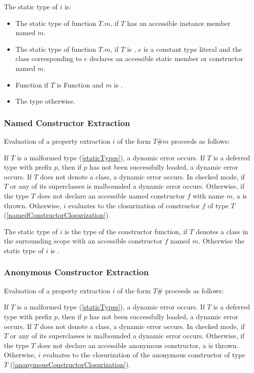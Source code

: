 \documentclass{article}
\newcommand{\code}[1]{{\sf #1}}
\begin{document}
The static type of $i$ is:
\begin{itemize}
\item The static type of function $T.m$, if $T$ has an accessible instance member named $m$.
\item The static type of function $T.m$, if $T$ is , $e$ is a constant type literal and the class corresponding to $e$ declares an accessible static member or constructor named $m$.
\item \code{Function} if $T$ is \code{Function} and $m$ is \CALL.
\item The type  \DYNAMIC{} otherwise. 
\end{itemize}

\subsubsection{Named Constructor Extraction}

\LMHash{}
Evaluation of a property extraction $i$ of the form \NEW{} $T\#m$ proceeds as follows:

\LMHash{}
If $T$ is a malformed type (\ref{staticTypes}), a dynamic error occurs. If $T$ is a deferred type with prefix $p$, then if $p$ has not been successfully loaded, a dynamic error occurs. If $T$ does not denote a class, a dynamic error occurs. In checked mode, if $T$ or any of its superclasses is malbounded a dynamic error occurs. Otherwise, if the type $T$ does not declare an accessible named constructor $f$ with name $m$, a  is thrown. Otherwise, $i$ evaluates to the closurization of constructor $f$ of type $T$ (\ref{namedConstructorClosurization}).


\LMHash{}
The static type of $i$ is the type of the constructor function, if $T$ denotes a class in the surrounding scope with an accessible constructor $f$ named $m$. Otherwise the static type of $i$ is \DYNAMIC{}.

\subsubsection{Anonymous Constructor Extraction}

\LMHash{}
Evaluation of a property extraction $i$ of the form \NEW{} $T\#$ proceeds as follows:

\LMHash{}
If $T$ is a malformed type (\ref{staticTypes}), a dynamic error occurs. If $T$ is a deferred type with prefix $p$, then if $p$ has not been successfully loaded, a dynamic error occurs. If $T$ does not denote a class, a dynamic error occurs. In checked mode, if $T$ or any of its superclasses is malbounded a dynamic error occurs. Otherwise, if the type $T$ does not declare an accessible anonymous constructor, a  is thrown. Otherwise, $i$ evaluates to the closurization of the anonymous constructor of type $T$ (\ref{anonymousConstructorClosurization}).
\end{document}
